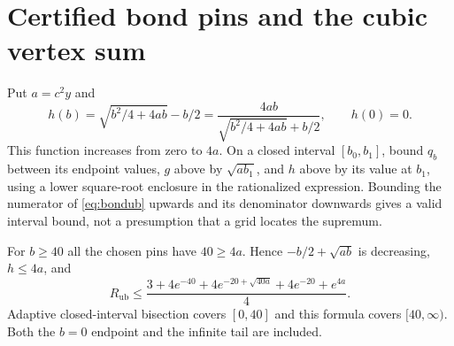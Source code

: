 \documentclass[11pt]{article}
\theoremstyle{plain}
\theoremstyle{remark}
\begin{document}
\section{Certified bond pins and the cubic vertex sum}\label{sec:cubicbudget}

Put $a=c^2y$ and
\[
h(b)=\sqrt{b^2/4+4ab}-b/2
=\frac{4ab}{\sqrt{b^2/4+4ab}+b/2},\qquad h(0)=0.
\]
This function increases from zero to $4a$. On a closed interval
$[b_0,b_1]$, bound $q_b$ between its endpoint values, $g$ above by
$\sqrt{ab_1}$, and $h$ above by its value at $b_1$, using a lower square-root
enclosure in the rationalized expression. Bounding the numerator of
\eqref{eq:bondub} upwards and its denominator downwards gives a valid
interval bound, not a presumption that a grid locates the supremum.

For $b\ge40$ all the chosen pins have $40\ge4a$. Hence
$-b/2+\sqrt{ab}$ is decreasing, $h\le4a$, and
\begin{equation}\label{eq:inftail}
R_{\mathrm{ub}}\le
\frac{3+4e^{-40}+4e^{-20+\sqrt{40a}}+4e^{-20}+e^{4a}}4.
\end{equation}
Adaptive closed-interval bisection covers $[0,40]$ and this formula covers
$[40,\infty)$. Both the $b=0$ endpoint and the infinite tail are included.
\end{document}
